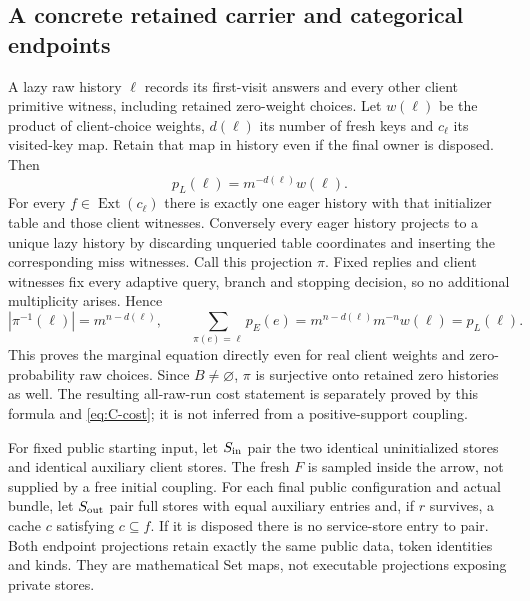 \subsection{A concrete retained carrier and categorical endpoints}\label{sec:C-span}
A lazy raw history $\ell$ records its first-visit answers and every other
client primitive witness, including retained zero-weight choices. Let
$w(\ell)$ be the product of client-choice weights, $d(\ell)$ its number
of fresh keys and $c_\ell$ its visited-key map. Retain that map in history
even if the final owner is disposed. Then
\[
p_L(\ell)=m^{-d(\ell)}w(\ell).
\]
For every $f\in\operatorname{Ext}(c_\ell)$ there is exactly one eager
history with that initializer table and those client witnesses. Conversely
every eager history projects to a unique lazy history by discarding
unqueried table coordinates and inserting the corresponding miss witnesses.
Call this projection $\pi$. Fixed replies and client witnesses fix every
adaptive query, branch and stopping decision, so no additional multiplicity
arises. Hence
\begin{equation}\label{eq:C-fibre}
|\pi^{-1}(\ell)|=m^{n-d(\ell)},\qquad
\sum_{\pi(e)=\ell}p_E(e)
=m^{n-d(\ell)}m^{-n}w(\ell)=p_L(\ell).
\end{equation}
This proves the marginal equation directly even for real client weights
and zero-probability raw choices. Since $B\ne\varnothing$, $\pi$ is
surjective onto retained zero histories as well. The resulting all-raw-run
cost statement is separately proved by this formula and
\eqref{eq:C-cost}; it is not inferred from a positive-support coupling.

For fixed public starting input, let $S_{\rm in}$ pair the two identical
uninitialized stores and identical auxiliary client stores. The fresh
$F$ is sampled inside the arrow, not supplied by a free initial coupling.
For each final public configuration and actual bundle, let $S_{\rm out}$
pair full stores with equal auxiliary entries and, if $r$ survives, a
cache $c$ satisfying $c\subseteq f$. If it is disposed there is no
service-store entry to pair. Both endpoint projections retain exactly
the same public data, token identities and kinds. They are mathematical
Set maps, not executable projections exposing private stores.

